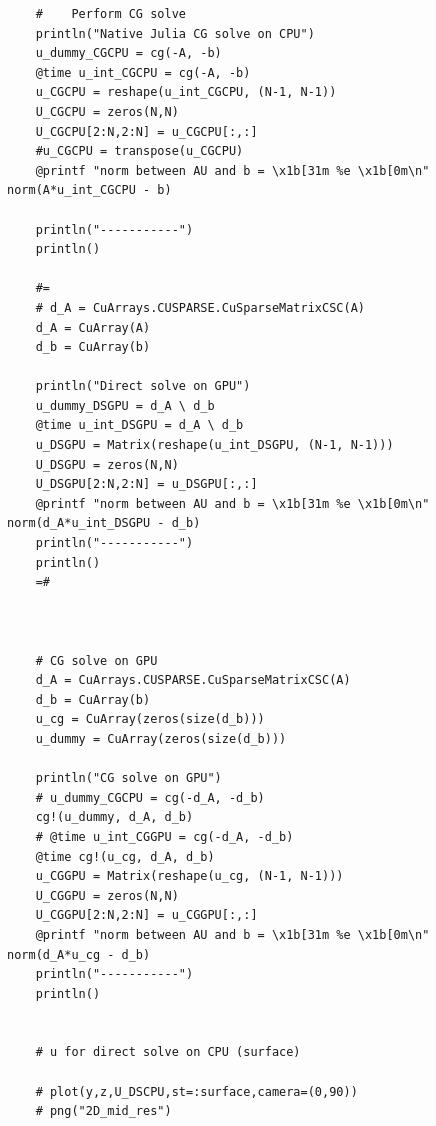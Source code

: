 \documentclass[11pt]{article}
\begin{document}
\begin{verbatim}
    #    Perform CG solve
    println("Native Julia CG solve on CPU")
    u_dummy_CGCPU = cg(-A, -b)
    @time u_int_CGCPU = cg(-A, -b)
    u_CGCPU = reshape(u_int_CGCPU, (N-1, N-1))
    U_CGCPU = zeros(N,N)
    U_CGCPU[2:N,2:N] = u_CGCPU[:,:]
    #u_CGCPU = transpose(u_CGCPU)
    @printf "norm between AU and b = \x1b[31m %e \x1b[0m\n" norm(A*u_int_CGCPU - b)

    println("-----------")
    println()

    #=
    # d_A = CuArrays.CUSPARSE.CuSparseMatrixCSC(A)
    d_A = CuArray(A)
    d_b = CuArray(b)

    println("Direct solve on GPU")
    u_dummy_DSGPU = d_A \ d_b
    @time u_int_DSGPU = d_A \ d_b
    u_DSGPU = Matrix(reshape(u_int_DSGPU, (N-1, N-1)))
    U_DSGPU = zeros(N,N)
    U_DSGPU[2:N,2:N] = u_DSGPU[:,:]
    @printf "norm between AU and b = \x1b[31m %e \x1b[0m\n" norm(d_A*u_int_DSGPU - d_b)
    println("-----------")
    println()
    =#



    # CG solve on GPU
    d_A = CuArrays.CUSPARSE.CuSparseMatrixCSC(A)
    d_b = CuArray(b)
    u_cg = CuArray(zeros(size(d_b)))
    u_dummy = CuArray(zeros(size(d_b)))

    println("CG solve on GPU")
    # u_dummy_CGCPU = cg(-d_A, -d_b)
    cg!(u_dummy, d_A, d_b)
    # @time u_int_CGGPU = cg(-d_A, -d_b)
    @time cg!(u_cg, d_A, d_b)
    u_CGGPU = Matrix(reshape(u_cg, (N-1, N-1)))
    U_CGGPU = zeros(N,N)
    U_CGGPU[2:N,2:N] = u_CGGPU[:,:]
    @printf "norm between AU and b = \x1b[31m %e \x1b[0m\n" norm(d_A*u_cg - d_b)
    println("-----------")
    println()


    # u for direct solve on CPU (surface)

    # plot(y,z,U_DSCPU,st=:surface,camera=(0,90))
    # png("2D_mid_res")


	\end{verbatim}
\end{document}
